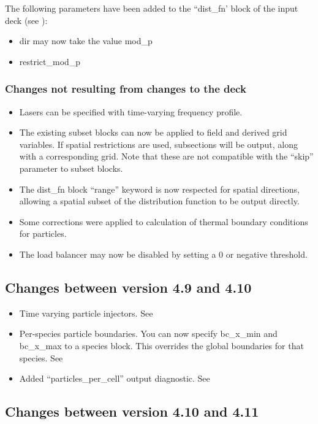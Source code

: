 \noindent The following parameters have been added to the ``dist\_fn' block of
the input deck (see ):
\begin{itemize}
\item dir may now take the value mod\_p
\item restrict\_mod\_p
\end{itemize}

\subsubsection{Changes not resulting from changes to the deck}
\begin{itemize}
\item Lasers can be specified with time-varying frequency profile.
\item The existing subset blocks can now be applied to field and derived grid
  variables. If spatial restrictions are used, subsections will be output,
  along with a corresponding grid.
  Note that these are not compatible with the ``skip'' parameter to subset
  blocks.
\item The dist\_fn block ``range'' keyword is now respected for spatial
  directions, allowing a spatial subset of the distribution function to be
  output directly.
\item Some corrections were applied to calculation of thermal boundary
  conditions for particles.
\item The load balancer may now be disabled by setting a 0 or negative
  threshold.
\end{itemize}
\bigskip


\subsection{Changes between version 4.9 and 4.10}

\begin{itemize}
\item Time varying particle injectors. See 
\item Per-species particle boundaries. You can now specify bc\_x\_min and
   bc\_x\_max to a species block. This overrides the global boundaries for that
   species. See 
\item Added ``particles\_per\_cell'' output diagnostic.
   See 
\end{itemize}
\bigskip


\subsection{Changes between version 4.10 and 4.11}

